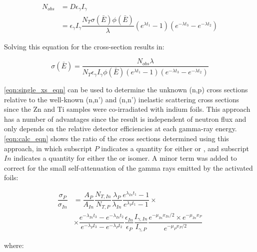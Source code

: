 \documentclass[5p]{elsarticle}
\newcommand{\pp}[1]{\left( #1\right)}
\begin{document}
 

\begin{align}
N_{obs} &= D \epsilon_\gamma I_\gamma \\
&=  \epsilon_\gamma I_\gamma  \dfrac{N_T \sigma\pp{\bar{E}} \phi\pp{\bar{E}} }{\lambda}\pp{e^{\lambda t_1}-1}\pp{e^{-\lambda t_3} - e^{-\lambda t_2}} \nonumber
\end{align}

Solving this equation for the  cross-section results in:

\begin{equation}\label{eqn:single_xs_eqn}
\sigma\pp{\bar{E}} = \dfrac{N_{obs}\lambda}{N_T \epsilon_\gamma I_\gamma  \phi\pp{\bar{E}}  \pp{e^{\lambda t_1}-1}\pp{e^{-\lambda t_3} - e^{-\lambda t_2}}}
\end{equation}

\autoref{eqn:single_xs_eqn} can be used to determine the unknown (n,p) cross sections relative to the well-known (n,n') and (n,n') inelastic scattering cross sections since the Zn and Ti samples were co-irradiated with indium foils. This approach has a number of advantages since the result is independent of neutron flux and only depends on the relative detector efficiencies at each gamma-ray energy.  \autoref{eqn:calc_eqn} shows the ratio of the cross sections determined using this approach, in which subscript $P$ indicates a quantity for either  or , and subscript $In$ indicates a quantity for either the  or  isomer. A minor term was added to correct for the small self-attenuation of the gamma rays emitted by the activated foils:



\begin{align}\label{eqn:calc_eqn}
\dfrac{\sigma_P}{\sigma_{In}} &=  \dfrac{A_P}{A_{In}} \dfrac{N_{T,In}}{N_{T,P}} \dfrac{\lambda_P}{\lambda_{In}} \dfrac{e^{\lambda_{In}t_1}-1}{e^{\lambda_{P}t_1}-1} \times \\
&\times \dfrac{e^{-\lambda_{In}t_3}-e^{-\lambda_{In}t_2}}{e^{-\lambda_{P}t_3} - e^{-\lambda_{P}t_2}} \dfrac{\epsilon_{In}}{\epsilon_P}  \dfrac{I_{\gamma,In}}{I_{\gamma,P}} \dfrac{e^{-\mu_{In}x_{In}/2}\times e^{-\mu_{In}x_{P}}}{e^{-\mu_{P}x_{P}/2}} \nonumber
\end{align}

where:
\end{document}
